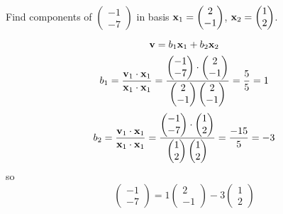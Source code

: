 \documentclass[10pt, a4paper]{article}
\begin{document}
\begin{example}
    Find components of $\begin{pmatrix}
        -1 \\ -7
    \end{pmatrix}$
    in basis $\mathbf{x}_1 = \begin{pmatrix}
        2 \\ -1
    \end{pmatrix}$,
    $\mathbf{x}_2 = \begin{pmatrix}
        1 \\ 2
    \end{pmatrix}$.
    
    \begin{solution}
        \[
        \mathbf{v} = b_1\mathbf{x}_1 + b_2\mathbf{x}_2
        \]
        \[
        b_1 = \frac{\mathbf{v}_1 \cdot \mathbf{x}_1}{\mathbf{x}_1 \cdot \mathbf{x}_1} = \frac{\begin{pmatrix}
            -1 \\ -7
        \end{pmatrix} \cdot \begin{pmatrix}
            2 \\ -1
        \end{pmatrix}}{\begin{pmatrix}
            2 \\ -1
        \end{pmatrix}\begin{pmatrix}
            2 \\ -1
        \end{pmatrix}} = \frac{5}{5} = 1
        \]
        \[
        b_2 = \frac{\mathbf{v}_1 \cdot \mathbf{x}_1}{\mathbf{x}_1 \cdot \mathbf{x}_1} = \frac{\begin{pmatrix}
            -1 \\ -7
        \end{pmatrix} \cdot \begin{pmatrix}
            1 \\ 2
        \end{pmatrix}}{\begin{pmatrix}
            1 \\ 2
        \end{pmatrix}\begin{pmatrix}
            1 \\ 2
        \end{pmatrix}} = \frac{-15}{5} = -3
        \]
        so
        \[
        \begin{pmatrix}
            -1 \\ -7
        \end{pmatrix} = 1\begin{pmatrix}
            2 \\ -1
        \end{pmatrix} -3\begin{pmatrix}
            1 \\ 2
        \end{pmatrix}
        \]
    \end{solution}
\end{example}
\end{document}
